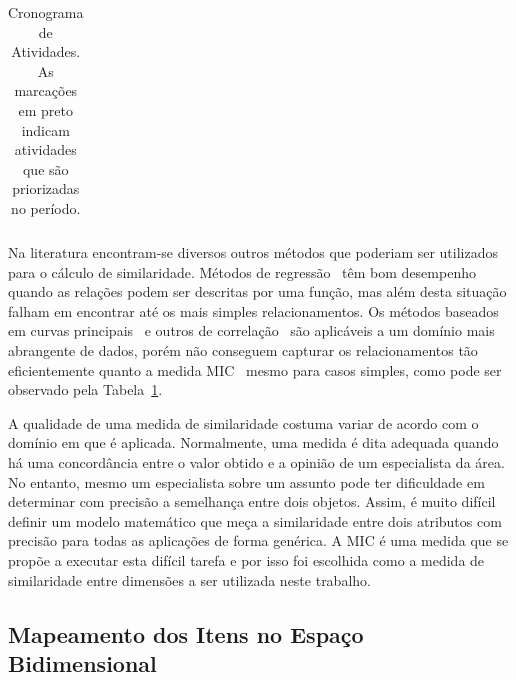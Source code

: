 \begin{table}
    \caption[Cronograma de atividades]{Cronograma de Atividades. As marcações em preto        indicam atividades que são priorizadas no período.}
    \begin{center}
        \begin{tabular}{|c|c|c|c|c|c|c|}
        \end{tabular}
    \end{center}
    \label{tab:corrs}
\end{table}





Na literatura encontram-se diversos outros métodos que poderiam ser utilizados para o cálculo de similaridade. Métodos de regressão~\cite{Friedman2001, Cleveland1988, Stone1977} têm bom desempenho quando as relações podem ser descritas por uma função, mas além desta situação falham em encontrar até os mais simples relacionamentos. Os métodos baseados em curvas principais~\cite{Hastie1989, Tibshirani1992, Delicado2008} e outros de correlação~\cite{Reny1959, Breiman1985, Kosorok2009} são aplicáveis a um domínio mais abrangente de dados, porém não conseguem capturar os relacionamentos tão eficientemente quanto a medida MIC~\cite{Reshef2011} mesmo para casos simples, como pode ser observado pela Tabela~\ref{tab:corrs}.    

A qualidade de uma medida de similaridade costuma variar de acordo com o domínio em que é aplicada. Normalmente, uma medida é dita adequada quando há uma concordância entre o valor obtido e a opinião de um especialista da área. No entanto, mesmo um especialista sobre um assunto pode ter dificuldade em determinar com precisão a semelhança entre dois objetos. Assim, é muito difícil definir um modelo matemático que meça a similaridade entre dois atributos com precisão para todas as aplicações de forma genérica. A MIC é uma medida que se propõe a executar esta difícil tarefa e por isso foi escolhida como a medida de similaridade entre dimensões a ser utilizada neste trabalho. 

\subsection{Mapeamento dos Itens no Espaço Bidimensional}
